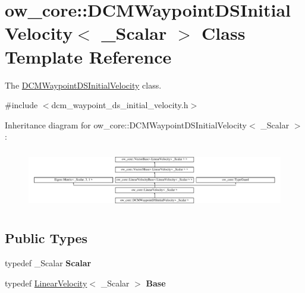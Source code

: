 \hypertarget{classow__core_1_1DCMWaypointDSInitialVelocity}{}\section{ow\+\_\+core\+:\+:D\+C\+M\+Waypoint\+D\+S\+Initial\+Velocity$<$ \+\_\+\+Scalar $>$ Class Template Reference}
\label{classow__core_1_1DCMWaypointDSInitialVelocity}


The \hyperlink{classow__core_1_1DCMWaypointDSInitialVelocity}{D\+C\+M\+Waypoint\+D\+S\+Initial\+Velocity} class.  




{\ttfamily \#include $<$dcm\+\_\+waypoint\+\_\+ds\+\_\+initial\+\_\+velocity.\+h$>$}

Inheritance diagram for ow\+\_\+core\+:\+:D\+C\+M\+Waypoint\+D\+S\+Initial\+Velocity$<$ \+\_\+\+Scalar $>$\+:\begin{figure}[H]
\begin{center}
\leavevmode
\includegraphics[height=2.599814cm]{d9/dda/classow__core_1_1DCMWaypointDSInitialVelocity}
\end{center}
\end{figure}
\subsection*{Public Types}
\begin{DoxyCompactItemize}
\item 
typedef \+\_\+\+Scalar {\bfseries Scalar}\hypertarget{classow__core_1_1DCMWaypointDSInitialVelocity_ae516fd886e9f38a3c1bd70cd1fb9e1e1}{}\label{classow__core_1_1DCMWaypointDSInitialVelocity_ae516fd886e9f38a3c1bd70cd1fb9e1e1}

\item 
typedef \hyperlink{classow__core_1_1LinearVelocity}{Linear\+Velocity}$<$ \+\_\+\+Scalar $>$ {\bfseries Base}\hypertarget{classow__core_1_1DCMWaypointDSInitialVelocity_a1bdb1d8bcd6dcbcf46ce0c1f42ca3c17}{}\label{classow__core_1_1DCMWaypointDSInitialVelocity_a1bdb1d8bcd6dcbcf46ce0c1f42ca3c17}

\end{DoxyCompactItemize}
